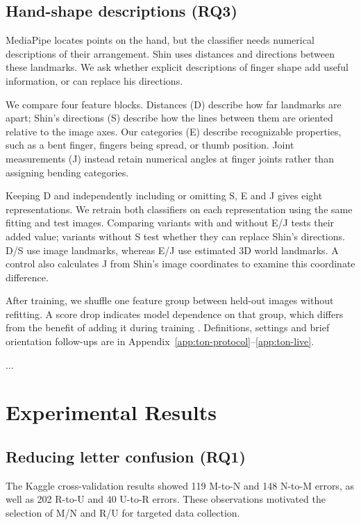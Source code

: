 \subsection{Hand-shape descriptions (RQ3)}\label{sec:ton-methods}
MediaPipe locates points on the hand, but the classifier needs numerical descriptions of their arrangement. Shin uses distances and directions between these landmarks. We ask whether explicit descriptions of finger shape add useful information, or can replace his directions.

We compare four feature blocks. Distances (D) describe how far landmarks are apart; Shin's directions (S) describe how the lines between them are oriented relative to the image axes. Our categories (E) describe recognizable properties, such as a bent finger, fingers being spread, or thumb position. Joint measurements (J) instead retain numerical angles at finger joints rather than assigning bending categories.

Keeping D and independently including or omitting S, E and J gives eight representations. We retrain both classifiers on each representation using the same fitting and test images. Comparing variants with and without E/J tests their added value; variants without S test whether they can replace Shin's directions. D/S use image landmarks, whereas E/J use estimated 3D world landmarks. A control also calculates J from Shin's image coordinates to examine this coordinate difference.

After training, we shuffle one feature group between held-out images without refitting. A score drop indicates model dependence on that group, which differs from the benefit of adding it during training \citep{ton-sklearnpermutation}. Definitions, settings and brief orientation follow-ups are in Appendix~\ref{app:ton-protocol}--\ref{app:ton-live}.
\par\noindent ...\par\medskip

\section{Experimental Results}
\subsection{Reducing letter confusion (RQ1)}
The Kaggle cross-validation results showed 119 M-to-N and 148 N-to-M errors, as well as 202 R-to-U and 40 U-to-R errors. These observations motivated the selection of M/N and R/U for targeted data collection.

